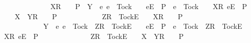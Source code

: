\begin{isabellebody}
\ \ \ \ \ \ \ \ \ \ \ {\isacharparenleft}{\isasymrho}\ {\isacharat}\ {\isacharbrackleft}X{\isacharbrackright}\isactrlsub R\ {\isacharhash}\ {\isasymsigma}\ {\isasymin}\ P\ {\isasymand}\ Y\ {\isasyminter}\ {\isacharbraceleft}e{\isachardot}\ e\ {\isasymnoteq}\ Tock\ {\isasymand}\ {\isasymrho}\ {\isacharat}\ {\isacharbrackleft}{\isacharbrackleft}e{\isacharbrackright}\isactrlsub E{\isacharbrackright}\ {\isasymin}\ P\ {\isasymor}\ e\ {\isacharequal}\ Tock\ {\isasymand}\ {\isasymrho}\ {\isacharat}\ {\isacharbrackleft}{\isacharbrackleft}X{\isacharbrackright}\isactrlsub R{\isacharcomma}\ {\isacharbrackleft}e{\isacharbrackright}\isactrlsub E{\isacharbrackright}\ {\isasymin}\ P{\isacharbraceright}\ {\isacharequal}\ {\isacharbraceleft}{\isacharbraceright}\ {\isasymLongrightarrow}\ {\isasymrho}\ {\isacharat}\ {\isacharbrackleft}X\ {\isasymunion}\ Y{\isacharbrackright}\isactrlsub R\ {\isacharhash}\ {\isasymsigma}\ {\isasymin}\ P{\isacharparenright}\ {\isasymLongrightarrow}\isanewline
\ \ \ \ \ \ \ \ \ \ \ {\isacharbrackleft}Z{\isacharbrackright}\isactrlsub R\ {\isacharhash}\ {\isacharbrackleft}Tock{\isacharbrackright}\isactrlsub E\ {\isacharhash}\ {\isasymrho}\ {\isacharat}\ {\isacharbrackleft}X{\isacharbrackright}\isactrlsub R\ {\isacharhash}\ {\isasymsigma}\ {\isasymin}\ P\ {\isasymand}\isanewline
\ \ \ \ \ \ \ \ \ \ \ Y\ {\isasyminter}\ {\isacharbraceleft}e{\isachardot}\ e\ {\isasymnoteq}\ Tock\ {\isasymand}\ {\isacharbrackleft}Z{\isacharbrackright}\isactrlsub R\ {\isacharhash}\ {\isacharbrackleft}Tock{\isacharbrackright}\isactrlsub E\ {\isacharhash}\ {\isasymrho}\ {\isacharat}\ {\isacharbrackleft}{\isacharbrackleft}e{\isacharbrackright}\isactrlsub E{\isacharbrackright}\ {\isasymin}\ P\ {\isasymor}\ e\ {\isacharequal}\ Tock\ {\isasymand}\ {\isacharbrackleft}Z{\isacharbrackright}\isactrlsub R\ {\isacharhash}\ {\isacharbrackleft}Tock{\isacharbrackright}\isactrlsub E\ {\isacharhash}\ {\isasymrho}\ {\isacharat}\ {\isacharbrackleft}{\isacharbrackleft}X{\isacharbrackright}\isactrlsub R{\isacharcomma}\ {\isacharbrackleft}e{\isacharbrackright}\isactrlsub E{\isacharbrackright}\ {\isasymin}\ P{\isacharbraceright}\ {\isacharequal}\ {\isacharbraceleft}{\isacharbraceright}\ {\isasymLongrightarrow}\isanewline
\ \ \ \ \ \ \ \ \ \ \ {\isacharbrackleft}Z{\isacharbrackright}\isactrlsub R\ {\isacharhash}\ {\isacharbrackleft}Tock{\isacharbrackright}\isactrlsub E\ {\isacharhash}\ {\isasymrho}\ {\isacharat}\ {\isacharbrackleft}X\ {\isasymunion}\ Y{\isacharbrackright}\isactrlsub R\ {\isacharhash}\ {\isasymsigma}\ {\isasymin}\ P{\isacharparenright}\ {\isasymLongrightarrow}\isanewline

\end{isabellebody}
